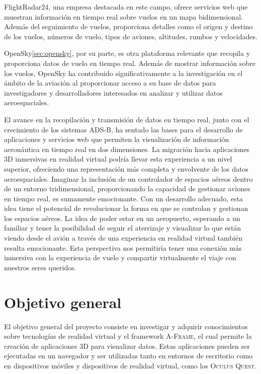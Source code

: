 \documentclass[a4paper, 11pt]{book}
\begin{document}
FlightRadar24, una empresa destacada en este campo, ofrece servicios web que muestran información en tiempo real sobre vuelos en un mapa bidimensional. Además del seguimiento de vuelos, proporciona detalles como el origen y destino de los vuelos, números de vuelo, tipos de aviones, altitudes, rumbos y velocidades.

OpenSky\ref{sec:opensky}, por su parte, es otra plataforma relevante que recopila y proporciona datos de vuelo en tiempo real. Además de mostrar información sobre los vuelos, OpenSky ha contribuido significativamente a la investigación en el ámbito de la aviación al proporcionar acceso a su base de datos para investigadores y desarrolladores interesados en analizar y utilizar datos aeroespaciales.

El avance en la recopilación y transmisión de datos en tiempo real, junto con el crecimiento de los sistemas \textsc{ADS-B}, ha sentado las bases para el desarrollo de aplicaciones y servicios web que permiten la visualización de información aeronáutica en tiempo real en dos dimensiones. La migración hacia aplicaciones \textsc{3D} inmersivas en realidad virtual podría llevar esta experiencia a un nivel superior, ofreciendo una representación más completa y envolvente de los datos aeroespaciales.
Imaginar la inclusión de un controlador de espacios aéreos dentro de un entorno tridimensional, proporcionando la capacidad de gestionar aviones en tiempo real, es sumamente emocionante. Con un desarrollo adecuado, esta idea tiene el potencial de revolucionar la forma en que se controlan y gestionan los espacios aéreos.
La idea de poder estar en un aeropuerto, esperando a un familiar y tener la posibilidad de seguir el aterrizaje y visualizar lo que están viendo desde el avión a través de una experiencia en realidad virtual también resulta emocionante. Esta perspectiva nos permitiría tener una conexión más inmersiva con la experiencia de vuelo y compartir virtualmente el viaje con nuestros seres queridos. 


\newpage
\section{Objetivo general}
\label{sec:objetivoGeneral}
El objetivo general del proyecto consiste en investigar y adquirir conocimientos sobre tecnologías de realidad virtual y el framework \textsc{A-Frame}, el cual permite la creación de aplicaciones \gls{3D} para visualizar datos. Estas aplicaciones pueden ser ejecutadas en un navegador y ser utilizadas tanto en entornos de escritorio como en dispositivos móviles y dispositivos de realidad virtual, como los \textsc{Oculus Quest}.
\end{document}
